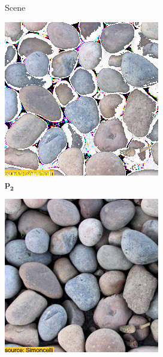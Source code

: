 \begin{figure}[ht]
\begin{subfigure}{\textwidth}
\begin{subfigure}{0.2\textwidth}
            \caption*{Scene}
            \label{fig:intro_pixels_vs_stats-stats_bg}
        \end{subfigure}
        \hfill
        \begin{subfigure}{0.2\textwidth}
            \centering
            \includegraphics[width=\textwidth]{images/01-pixels_vs_stats-stats_opt.jpg}
            \caption*{\(\bm{p_2}\)}
            \label{fig:intro_pixels_vs_stats-stats_opt}
        \end{subfigure}
        \hfill
        \begin{subfigure}{0.2\textwidth}
            \centering
            \includegraphics[width=\textwidth]{images/01-pixels_vs_stats-stats_proj.jpg}

\end{subfigure}
\end{subfigure}
\end{figure}
